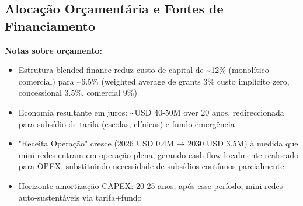 \documentclass[12pt, a4paper]{article}
\begin{document}
\subsection{Alocação Orçamentária e Fontes de Financiamento}

\begin{table}[H]
\centering
\caption{Orçamento Agregado 2026-2030 (USD) e Estrutura de Financiamento}
\label{tab:budget}
\small
{}
\end{table}

\textbf{Notas sobre orçamento:}
\begin{itemize}
\item Estrutura blended finance reduz custo de capital de \textasciitilde{}12\% (monolítico comercial) para \textasciitilde{}6.5\% (weighted average de grants 3\% custo implícito zero, concessional 3.5\%, comercial 9\%)
\item Economia resultante em juros: \textasciitilde{}USD 40-50M over 20 anos, redireccionada para subsídio de tarifa (escolas, clínicas) e fundo emergência
\item "Receita Operação" cresce (2026 USD 0.4M → 2030 USD 3.5M) à medida que mini-redes entram em operação plena, gerando cash-flow localmente realocado para OPEX, substituindo necessidade de subsídios contínuos parcialmente
\item Horizonte amortização CAPEX: 20-25 anos;
 após esse período, mini-redes auto-sustentáveis via tarifa+fundo
\end{itemize}
\end{document}
